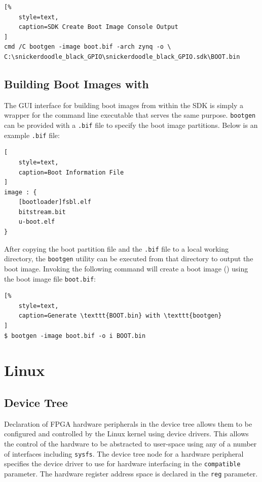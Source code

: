\begin{lstlisting}[%
	style=text,
	caption=SDK Create Boot Image Console Output
]
cmd /C bootgen -image boot.bif -arch zynq -o \
C:\snickerdoodle_black_GPIO\snickerdoodle_black_GPIO.sdk\BOOT.bin 
\end{lstlisting}


\subsection{Building Boot Images with }


The GUI interface for building boot images from within the SDK is simply a wrapper for the command line executable that serves the same purpose. \texttt{bootgen} can be provided with a \texttt{.bif} file to specify the boot image partitions. Below is an example \texttt{.bif} file:

\begin{lstlisting}[
	style=text, 
	caption=Boot Information File
]
image : {
	[bootloader]fsbl.elf
	bitstream.bit
	u-boot.elf
}
\end{lstlisting}


After copying the boot partition file and the \texttt{.bif} file to a local working directory, the \texttt{bootgen} utility can be executed from that directory to output the boot image. Invoking the following command will create a boot image () using the boot image file \texttt{boot.bif}:


\begin{lstlisting}[%
	style=text,
	caption=Generate \texttt{BOOT.bin} with \texttt{bootgen}
]
$ bootgen -image boot.bif -o i BOOT.bin
\end{lstlisting}


\section{Linux}

\subsection{Device Tree}


Declaration of FPGA hardware peripherals in the device tree allows them to be configured and controlled by the Linux kernel using device drivers. This allows the control of the hardware to be abstracted to user-space using any of a number of interfaces including \texttt{sysfs}. The device tree node for a hardware peripheral specifies the device driver to use for hardware interfacing in the \texttt{compatible} parameter. The hardware register address space is declared in the \texttt{reg} parameter. 


